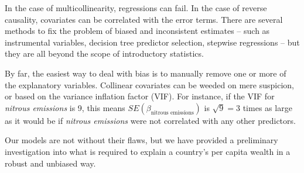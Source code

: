 \documentclass[11pt]{article}
\begin{document}
In the case of multicollinearity, regressions can fail. In the case of reverse causality, covariates can be correlated with the error terms. There are several methods to fix the problem of biased and inconsistent estimates -- such as instrumental variables, decision tree predictor selection, stepwise regressions -- but they are all beyond the scope of introductory statistics.

By far, the easiest way to deal with bias is to manually remove one or more of the explanatory variables. Collinear covariates can be weeded on mere suspicion, or based on the variance inflation factor (VIF). For instance, if the VIF for \emph{nitrous emissions} is 9, this means $SE(\beta_{\textrm{nitrous emissions}})$ is $\sqrt{9} = 3$ times as large as it would be if \emph{nitrous emissions} were not correlated with any other predictors.

Our models are not without their flaws, but we have provided a preliminary investigation into what is required to explain a country's per capita wealth in a robust and unbiased way.



\theendnotes
\end{document}
